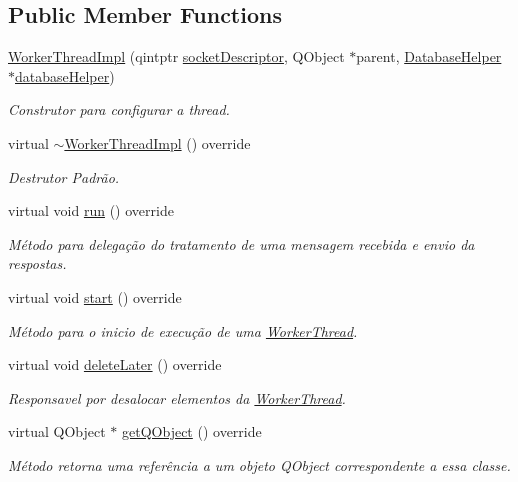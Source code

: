 \subsection*{Public Member Functions}
\begin{DoxyCompactItemize}
\item 
\hyperlink{classWorkerThreadImpl_a61d57c319668cbf86ad1642e8471b6db}{Worker\+Thread\+Impl} (qintptr \hyperlink{classWorkerThreadImpl_af3d6cf4437a92a4dbdf8c07a474a671b}{socket\+Descriptor}, Q\+Object $\ast$parent, \hyperlink{classDatabaseHelper}{Database\+Helper} $\ast$\hyperlink{classWorkerThreadImpl_a6a64f8daf91e56abf94c5a92bfc0fb88}{database\+Helper})
\begin{DoxyCompactList}\small\item\em Construtor para configurar a thread. \end{DoxyCompactList}\item 
virtual \hyperlink{classWorkerThreadImpl_acdb8da302c73c5ab454445029bbe6da1}{$\sim$\+Worker\+Thread\+Impl} () override\hypertarget{classWorkerThreadImpl_acdb8da302c73c5ab454445029bbe6da1}{}\label{classWorkerThreadImpl_acdb8da302c73c5ab454445029bbe6da1}

\begin{DoxyCompactList}\small\item\em Destrutor Padrão. \end{DoxyCompactList}\item 
virtual void \hyperlink{classWorkerThreadImpl_a24ef315ed0b7914ffd099c23a5a6e16c}{run} () override
\begin{DoxyCompactList}\small\item\em Método para delegação do tratamento de uma mensagem recebida e envio da respostas. \end{DoxyCompactList}\item 
virtual void \hyperlink{classWorkerThreadImpl_a16a04e1fd50d1bcb425e70a3ac219786}{start} () override
\begin{DoxyCompactList}\small\item\em Método para o inicio de execução de uma \hyperlink{classWorkerThread}{Worker\+Thread}. \end{DoxyCompactList}\item 
virtual void \hyperlink{classWorkerThreadImpl_a0c7acd90839e238ff12eba997132f532}{delete\+Later} () override\hypertarget{classWorkerThreadImpl_a0c7acd90839e238ff12eba997132f532}{}\label{classWorkerThreadImpl_a0c7acd90839e238ff12eba997132f532}

\begin{DoxyCompactList}\small\item\em Responsavel por desalocar elementos da \hyperlink{classWorkerThread}{Worker\+Thread}. \end{DoxyCompactList}\item 
virtual Q\+Object $\ast$ \hyperlink{classWorkerThreadImpl_a30689eaffcb664bc95644bf497ea1446}{get\+Q\+Object} () override
\begin{DoxyCompactList}\small\item\em Método retorna uma referência a um objeto Q\+Object correspondente a essa classe. \end{DoxyCompactList}\end{DoxyCompactItemize}
